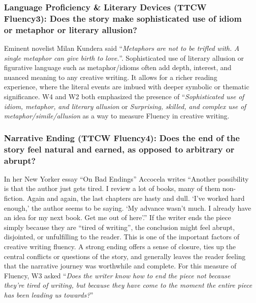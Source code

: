 \subsubsection{\textbf{{\color{blue}Language Proficiency \& Literary Devices (TTCW Fluency3)}: Does the story make sophisticated use of idiom or metaphor or literary allusion?}} Eminent novelist Milan Kundera said ``\textit{Metaphors are not to be trifled with. A single metaphor can give birth to love.}''. Sophisticated use of literary allusion or figurative language such as metaphor/idioms often add depth, interest, and nuanced meaning to any creative writing. It allows for a richer reading experience, where the literal events are imbued with deeper symbolic or thematic significance. W4 and W2 both emphasized the presence of ``\textit{Sophisticated use of idiom, metaphor, and literary allusion} or \textit{Surprising, skilled, and complex use of metaphor/simile/allusion} as a way to measure Fluency in creative writing.
\subsubsection{\textbf{{\color{blue}Narrative Ending (TTCW Fluency4)}: Does the end of the story feel natural and earned, as opposed to
arbitrary or abrupt?}} In her New Yorker essay ``On Bad Endings'' \cite{BadEndings} Accocela writes ``Another possibility is that the author just gets tired. I review a lot of books, many of them non-fiction. Again and again, the last chapters are hasty and dull. `I’ve worked hard enough,' the author seems to be saying. `My advance wasn’t much. I already have an idea for my next book. Get me out of here'.''
If the writer ends the piece simply because they are ``tired of writing'', the conclusion might feel abrupt, disjointed, or unfulfilling to the reader. This is one of the important factors of creative writing fluency. A strong ending offers a sense of closure, ties up the central conflicts or questions of the story, and generally leaves the reader feeling that the narrative journey was worthwhile and complete. For this measure of Fluency, W3 asked  ``\textit{Does the writer know how to end the piece not because they're tired of writing, but because they have come to the moment the entire piece has been leading us towards?}''
